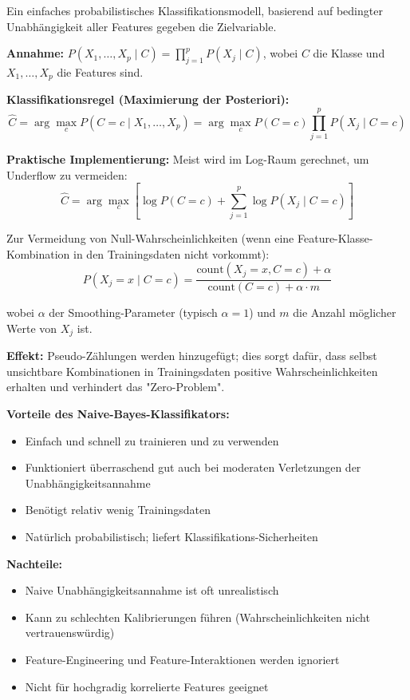 Ein einfaches probabilistisches Klassifikationsmodell, basierend auf bedingter Unabhängigkeit aller Features gegeben die Zielvariable.

\textbf{Annahme:} $P(X_1, \ldots, X_p \mid C) = \prod_{j=1}^{p} P(X_j \mid C)$, wobei $C$ die Klasse und $X_1, \ldots, X_p$ die Features sind.

\textbf{Klassifikationsregel (Maximierung der Posteriori):}
$$\hat{C} = \arg\max_c P(C = c \mid X_1, \ldots, X_p) = \arg\max_c P(C = c) \prod_{j=1}^{p} P(X_j \mid C = c)$$

\textbf{Praktische Implementierung:} Meist wird im Log-Raum gerechnet, um Underflow zu vermeiden:
$$\hat{C} = \arg\max_c \left[ \log P(C = c) + \sum_{j=1}^{p} \log P(X_j \mid C = c) \right]$$

Zur Vermeidung von Null-Wahrscheinlichkeiten (wenn eine Feature-Klasse-Kombination in den Trainingsdaten nicht vorkommt):
$$P(X_j = x \mid C = c) = \frac{\text{count}(X_j = x, C = c) + \alpha}{\text{count}(C = c) + \alpha \cdot m}$$

wobei $\alpha$ der Smoothing-Parameter (typisch $\alpha = 1$) und $m$ die Anzahl möglicher Werte von $X_j$ ist.

\textbf{Effekt:} Pseudo-Zählungen werden hinzugefügt; dies sorgt dafür, dass selbst unsichtbare Kombinationen in Trainingsdaten positive Wahrscheinlichkeiten erhalten und verhindert das "Zero-Problem".

\textbf{Vorteile des Naive-Bayes-Klassifikators:}
\begin{itemize}[leftmargin=1.5em]
    \item Einfach und schnell zu trainieren und zu verwenden
    \item Funktioniert überraschend gut auch bei moderaten Verletzungen der Unabhängigkeitsannahme
    \item Benötigt relativ wenig Trainingsdaten
    \item Natürlich probabilistisch; liefert Klassifikations-Sicherheiten
\end{itemize}

\textbf{Nachteile:}
\begin{itemize}[leftmargin=1.5em]
    \item Naive Unabhängigkeitsannahme ist oft unrealistisch
    \item Kann zu schlechten Kalibrierungen führen (Wahrscheinlichkeiten nicht vertrauenswürdig)
    \item Feature-Engineering und Feature-Interaktionen werden ignoriert
    \item Nicht für hochgradig korrelierte Features geeignet
\end{itemize}

